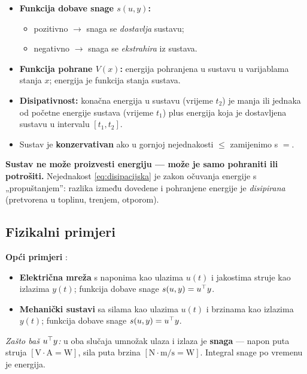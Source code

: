 \begin{itemize}
  \item \textbf{Funkcija dobave snage $s(u,y)$:}
        \begin{itemize}
          \item pozitivno $\to$ snaga se \emph{dostavlja} sustavu;
          \item negativno $\to$ snaga se \emph{ekstrahira} iz sustava.
        \end{itemize}
  \item \textbf{Funkcija pohrane $V(x)$:} energija pohranjena u sustavu u
        varijablama stanja $x$; energija je funkcija stanja sustava.
  \item \textbf{Disipativnost:} konačna energija u sustavu (vrijeme $t_2$) je
        manja ili jednaka od početne energije sustava (vrijeme $t_1$) plus
        energija koja je dostavljena sustavu u intervalu $[t_1,t_2]$.
  \item Sustav je \textbf{konzervativan} ako u gornjoj nejednakosti $\le$
        zamijenimo s $=$.
\end{itemize}

\begin{napomena}
\textbf{Sustav ne može proizvesti energiju --- može je samo pohraniti ili
potrošiti.} Nejednakost \eqref{eq:disipacijska} je zakon očuvanja energije s
„propuštanjem”: razlika između dovedene i pohranjene energije je
\emph{disipirana} (pretvorena u toplinu, trenjem, otporom).
\end{napomena}

\subsection{Fizikalni primjeri}

\textbf{Opći primjeri} :
\begin{itemize}
  \item \textbf{Električna mreža} s naponima kao ulazima $u(t)$ i jakostima
        struje kao izlazima $y(t)$; funkcija dobave snage $s(u,y) = u^{\top} y$.
  \item \textbf{Mehanički sustavi} sa silama kao ulazima $u(t)$ i brzinama kao
        izlazima $y(t)$; funkcija dobave snage $s(u,y) = u^{\top} y$.
\end{itemize}

\emph{Zašto baš $u^{\top} y$:} u oba slučaja umnožak ulaza i izlaza je
\textbf{snaga} --- napon puta struja $[\mathrm{V}\cdot\mathrm{A} =
\mathrm{W}]$, sila puta brzina $[\mathrm{N}\cdot\mathrm{m/s} = \mathrm{W}]$.
Integral snage po vremenu je energija.

